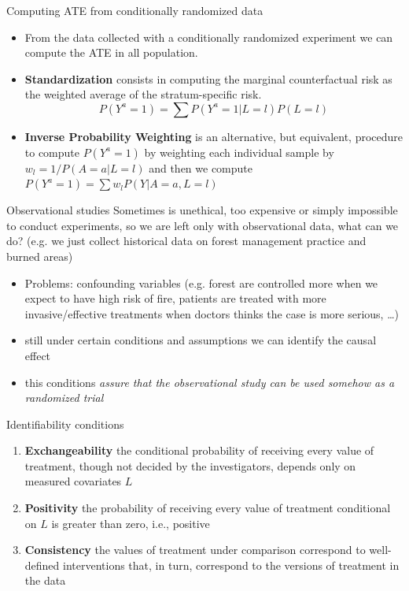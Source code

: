 \documentclass{beamer}
\begin{document}
\begin{frame}{Computing ATE from conditionally randomized data}
	\begin{itemize}
		\item<1-> From the data collected with a conditionally randomized experiment we can compute
			the ATE in all population.
		\item<2-> \textbf{Standardization} consists in computing the
			marginal counterfactual risk
			as the weighted average of the stratum-specific risk.
			\[ P(Y^a = 1) = \sum P(Y^a = 1| L = l)P(L = l) \]
		\item<3-> \textbf{Inverse Probability Weighting} is an alternative, but equivalent,
			procedure to compute $P(Y^a = 1)$ by weighting each individual sample
			by $w_l = 1 / P(A = a|L = l)$ and then we compute $P(Y^a = 1) = \sum w_l P(Y | A= a, L = l)$
	\end{itemize}
\end{frame}



\begin{frame}{Observational studies}
	Sometimes is unethical, too expensive or simply impossible to conduct experiments, so we are left only with observational data, what can we do? (e.g. we just collect historical
	data on forest management practice  and burned areas)
	\begin{itemize}
		\item<2-> Problems: confounding variables (e.g. forest are controlled more when we expect to
			have high risk of fire, patients are treated with more invasive/effective treatments when doctors thinks the case is more serious, \ldots)
		\item<3->  still under certain conditions and assumptions we can identify the
			causal effect
		\item<4-> this conditions 
		  \emph{assure that the observational study can be used
			somehow as a randomized trial}
	\end{itemize}
\end{frame}

\begin{frame}{Identifiability conditions}
  \begin{enumerate}
    \item<1-> \textbf{Exchangeability} the conditional probability
      of receiving every value of treatment, though
      not decided by the investigators, depends only on measured covariates $L$
    \item<2-> \textbf{Positivity} the probability of
      receiving every value of treatment conditional on $L$ is
      greater than zero, i.e., positive
    \item<3-> \textbf{Consistency} the values of treatment under comparison
      correspond to well-defined interventions that,
      in turn, correspond to the versions of treatment in the data
  \end{enumerate}
\end{frame}
\end{document}
